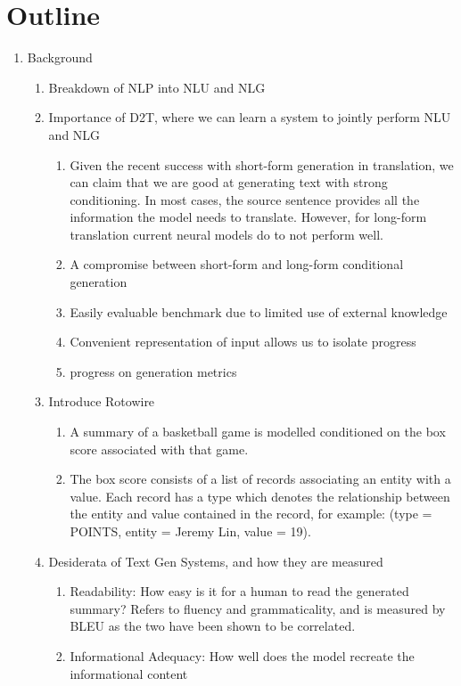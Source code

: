 \documentclass[11pt]{article}
\begin{document}
\section{Outline}
\begin{enumerate}
\item Background
\begin{enumerate}
\item Breakdown of NLP into NLU and NLG
\item Importance of D2T, where we can learn a system to jointly perform NLU and NLG
\begin{enumerate}
\item Given the recent success with short-form generation in translation,
we can claim that we are good at generating text with strong conditioning.
In most cases, the source sentence provides all the information the model needs to translate.
However, for long-form translation current neural models do to not perform well.
\item A compromise between short-form and long-form conditional generation  
\item Easily evaluable benchmark due to limited use of external knowledge
\item Convenient representation of input allows us to isolate progress
\item 
progress on generation metrics
\end{enumerate}
\item Introduce Rotowire \citep{wiseman2017d2t}
\begin{enumerate}
\item A summary of a basketball game is modelled conditioned on the box score
associated with that game.
\item The box score consists of a list of records associating an entity with a value.
Each record has a type which denotes the relationship between the entity and value
contained in the record,
for example: (type = POINTS, entity = Jeremy Lin, value = 19).
\end{enumerate}
\item Desiderata of Text Gen Systems, and how they are measured
\begin{enumerate}
\item Readability: How easy is it for a human to read the generated summary?
Refers to fluency and grammaticality, and is measured by BLEU as the two have been
shown to be correlated.
\item Informational Adequacy: How well does the model recreate the informational content

\end{enumerate}
\end{enumerate}
\end{enumerate}
\end{document}

